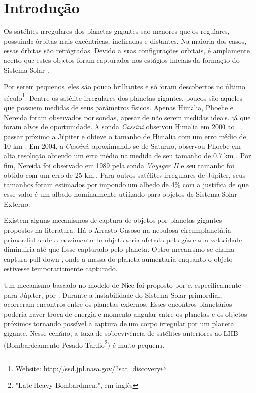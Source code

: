 \documentclass[12pt,a4paper]{monografia}
\begin{document}
\section{Introdução}
\label{Sec: Irr-intro}

\indent \indent Os satélites irregulares dos planetas gigantes são menores que os regulares, possuindo órbitas mais excêntricas, inclinadas e distantes. Na maioria dos casos, essas órbitas são retrógradas. Devido a suas configurações orbitais, é amplamente aceito que estes objetos foram capturados nos estágios iniciais da formação do Sistema Solar \citep{Sheppard2003}.

Por serem pequenos, eles são pouco brilhantes e só foram descobertos no último século\footnote{Website: \url{http://ssd.jpl.nasa.gov/?sat\_discovery}}. Dentre os satélite irregulares dos planetas gigantes, poucos são aqueles que possuem medidas de seus parâmetros físicos. Apenas Himalia, Phoebe e Nereida foram observados por sondas, apesar de não serem medidas ideais, já que foram alvos de oportunidade. A sonda \textit{Cassini} observou Himalia em 2000 ao passar próximo a Júpiter e obteve o tamanho de Himalia com um erro médio de 10 km \citep{Porco2003}. Em 2004, a \textit{Cassini}, aproximando-se de Saturno, observou Phoebe em alta resolução obtendo um erro médio na medida de seu tamanho de 0.7 km \citep{Thomas2010}. Por fim, Nereida foi observado em 1989 pela sonda \textit{Voyager II} e seu tamanho foi obtido com um erro de 25 km \citep{Smith1989}. Para outros satélites irregulares de Júpiter, seus tamanhos foram estimados por \cite{Rettig2001} impondo um albedo de 4\% com a justifica de que esse valor é um albedo nominalmente utilizado para objetos do Sistema Solar Externo.

Existem alguns mecanismos de captura de objetos por planetas gigantes propostos na literatura. Há o Arrasto Gasoso na nebulosa circumplanetária primordial \citep{Sheppard2005} onde o movimento do objeto seria afetado pelo gás e sua velocidade diminuiria até que fosse capturado pelo planeta. Outro mecanismo se chama captura pull-down \citep{Sheppard2005}, onde a massa do planeta aumentaria enquanto o objeto estivesse temporariamente capturado.

Um mecanismo baseado no modelo de Nice \citep{Morbidelli2005, Tsiganis2005, Gomes2005} foi proposto por \cite{Nesvorny2007} e, especificamente para Júpiter, por \cite{Nesvorny2014}. Durante a instabilidade do Sistema Solar primordial, ocorreram encontros entre os planetas externos. Esses encontros planetários poderia haver troca de energia e momento angular entre os planetas e os objetos próximos tornando possível a captura de um corpo irregular por um planeta gigante. Nesse cenário, a taxa de sobrevivência de satélites anteriores ao LHB (Bombardeamento Pesado Tardio\footnote{"Late Heavy Bombardment", em inglês}) é muito pequena.
\end{document}
